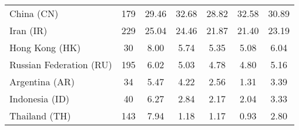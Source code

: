 \begin{table}[h!]
{\begin{tabular}{lcccccc}
China (CN) & \color{black} 179 & {\cellcolor[HTML]{E7F0FA}} \color[HTML]{000000} \color{black} 29.46 & {\cellcolor[HTML]{6AAED6}} \color[HTML]{F1F1F1} \color{black} 32.68 & {\cellcolor[HTML]{F7FBFF}} \color[HTML]{000000} \color{black} 28.82 & {\cellcolor[HTML]{71B1D7}} \color[HTML]{F1F1F1} \color{black} 32.58 & \color{black} 30.89 \\
Iran (IR) & \color{black} 229 & {\cellcolor[HTML]{6AAED6}} \color[HTML]{F1F1F1} \color{black} 25.04 & {\cellcolor[HTML]{8CC0DD}} \color[HTML]{000000} \color{black} 24.46 & {\cellcolor[HTML]{EAF3FB}} \color[HTML]{000000} \color{black} 21.87 & {\cellcolor[HTML]{F7FBFF}} \color[HTML]{000000} \color{black} 21.40 & \color{black} 23.19 \\
Hong Kong (HK) & \color{black} 30 & {\cellcolor[HTML]{6CAED6}} \color[HTML]{F1F1F1} \color{black} 8.00 & {\cellcolor[HTML]{E1EDF8}} \color[HTML]{000000} \color{black} 5.74 & {\cellcolor[HTML]{EEF5FC}} \color[HTML]{000000} \color{black} 5.35 & {\cellcolor[HTML]{F7FBFF}} \color[HTML]{000000} \color{black} 5.08 & \color{black} 6.04 \\
Russian Federation (RU) & \color{black} 195 & {\cellcolor[HTML]{6AAED6}} \color[HTML]{F1F1F1} \color{black} 6.02 & {\cellcolor[HTML]{E3EEF9}} \color[HTML]{000000} \color{black} 5.03 & {\cellcolor[HTML]{F7FBFF}} \color[HTML]{000000} \color{black} 4.78 & {\cellcolor[HTML]{F6FAFF}} \color[HTML]{000000} \color{black} 4.80 & \color{black} 5.16 \\
Argentina (AR) & \color{black} 34 & {\cellcolor[HTML]{6AAED6}} \color[HTML]{F1F1F1} \color{black} 5.47 & {\cellcolor[HTML]{A6CEE4}} \color[HTML]{000000} \color{black} 4.22 & {\cellcolor[HTML]{D9E8F5}} \color[HTML]{000000} \color{black} 2.56 & {\cellcolor[HTML]{F7FBFF}} \color[HTML]{000000} \color{black} 1.31 & \color{black} 3.39 \\
Indonesia (ID) & \color{black} 40 & {\cellcolor[HTML]{6AAED6}} \color[HTML]{F1F1F1} \color{black} 6.27 & {\cellcolor[HTML]{E4EFF9}} \color[HTML]{000000} \color{black} 2.84 & {\cellcolor[HTML]{F4F9FE}} \color[HTML]{000000} \color{black} 2.17 & {\cellcolor[HTML]{F7FBFF}} \color[HTML]{000000} \color{black} 2.04 & \color{black} 3.33 \\
Thailand (TH) & \color{black} 143 & {\cellcolor[HTML]{6AAED6}} \color[HTML]{F1F1F1} \color{black} 7.94 & {\cellcolor[HTML]{F4F9FE}} \color[HTML]{000000} \color{black} 1.18 & {\cellcolor[HTML]{F4F9FE}} \color[HTML]{000000} \color{black} 1.17 & {\cellcolor[HTML]{F7FBFF}} \color[HTML]{000000} \color{black} 0.93 & \color{black} 2.80 \\

\end{tabular}}
\end{table}
